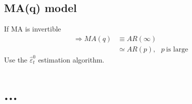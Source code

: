 \begin{multicols}{2}
\subsection{MA(q) model}\noindent
If MA is invertible
\begin{align*}
  \Rightarrow MA(q)&\equiv AR(\infty)\\
                  &\simeq AR(p),\ \ \ p\ \textrm{is large}
\end{align*}
Use the $\hat{\varepsilon}_t^0$ estimation algorithm.

\end{multicols}



\section{...}




